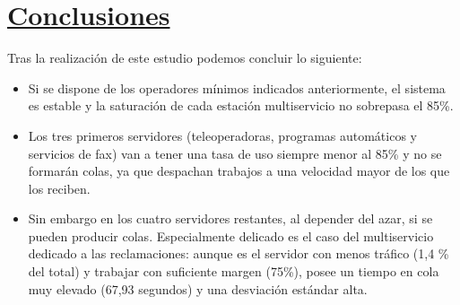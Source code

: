 \section{\textbf{\underline{Conclusiones}}}
Tras la realización de este estudio podemos concluir lo siguiente:
\begin{itemize}
\item Si se dispone de los operadores mínimos indicados anteriormente, el sistema es estable y la saturación de cada estación multiservicio no sobrepasa el 85\%.
\item Los tres primeros servidores (teleoperadoras, programas automáticos y servicios de fax) van a tener una tasa de uso siempre menor al 85\% y no se formarán colas, ya que despachan trabajos a una velocidad mayor de los que los reciben.
\item Sin embargo en los cuatro servidores restantes, al depender del azar, si se pueden producir colas. Especialmente delicado es el caso del multiservicio dedicado a las reclamaciones: aunque es el servidor con menos tráfico (1,4 \% del total) y trabajar con suficiente margen (75\%), posee un tiempo en cola muy elevado (67,93 segundos) y una desviación estándar alta.
\end{itemize}


